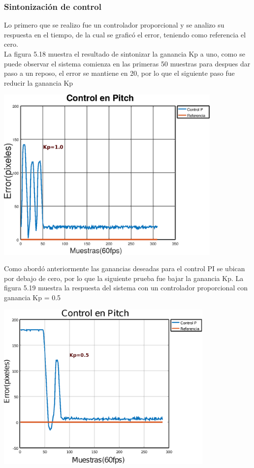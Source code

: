 \subsubsection{Sintonización de control}
Lo primero que se realizo fue un controlador proporcional y se analizo su respuesta en el tiempo, de la cual se graficó el error, teniendo 
como referencia el cero.\\
La figura 5.18 muestra el resultado de sintonizar la ganancia Kp a uno, como se puede observar el sistema comienza en las primeras 50 muestras
para despues dar paso a un reposo, el error se mantiene en 20, por lo que el siguiente paso fue reducir la ganancia Kp
\begin{center}
	\includegraphics[width=0.83\textwidth]{Contenido/Cuerpo/Capitulo5/Fig25.eps}
	\label{Fig4}
\end{center}
Como abordó anteriormente las ganancias deseadas para el control PI se ubican por debajo de cero, por lo que la siguiente prueba fue bajar la ganancia Kp.
La figura 5.19 muestra la respuesta del sistema con un controlador proporcional con ganancia Kp = 0.5
\begin{center}
	\includegraphics[width=0.8\textwidth]{Contenido/Cuerpo/Capitulo5/Fig26.eps}
	\label{Fig4}
\end{center}
